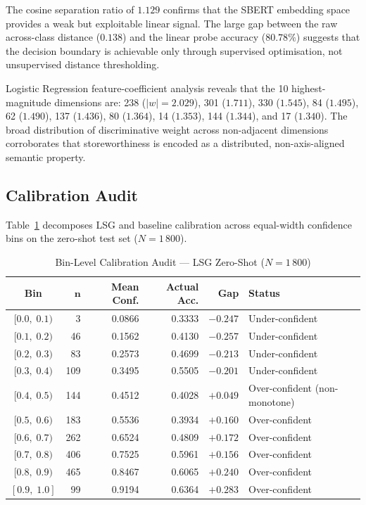 \documentclass[conference]{IEEEtran}
\begin{document}
The cosine separation ratio of $1.129$ confirms that the
SBERT embedding space provides a weak but exploitable
linear signal.
The large gap between the raw across-class distance
($0.138$) and the linear probe accuracy ($80.78\%$) suggests
that the decision boundary is achievable only through
supervised optimisation, not unsupervised distance thresholding.

Logistic Regression feature-coefficient analysis reveals that
the 10 highest-magnitude dimensions are: 238 ($|w|{=}2.029$),
301 ($1.711$), 330 ($1.545$), 84 ($1.495$), 62 ($1.490$),
137 ($1.436$), 80 ($1.364$), 14 ($1.353$), 144 ($1.344$),
and 17 ($1.340$).
The broad distribution of discriminative weight across
non-adjacent dimensions corroborates that storeworthiness is
encoded as a distributed, non-axis-aligned semantic property.

\subsection{Calibration Audit}
Table~\ref{tab:calib} decomposes LSG and baseline calibration
across equal-width confidence bins on the zero-shot test set
($N{=}1\,800$).

\begin{table}[t]
  \centering
  \caption{Bin-Level Calibration Audit --- LSG Zero-Shot ($N{=}1\,800$)}
  \label{tab:calib}
  \renewcommand{\arraystretch}{1.2}
  \begin{tabular}{@{}crrrrp{3.8cm}@{}}
    \toprule
    \textbf{Bin} & $\bm{n}$ & \textbf{Mean Conf.} & \textbf{Actual Acc.} & \textbf{Gap} & \textbf{Status} \\
    \midrule
    $[0.0,\;0.1)$ &   3 & 0.0866 & 0.3333 & $-0.247$ & Under-confident \\
    $[0.1,\;0.2)$ &  46 & 0.1562 & 0.4130 & $-0.257$ & Under-confident \\
    $[0.2,\;0.3)$ &  83 & 0.2573 & 0.4699 & $-0.213$ & Under-confident \\
    $[0.3,\;0.4)$ & 109 & 0.3495 & 0.5505 & $-0.201$ & Under-confident \\
    $[0.4,\;0.5)$ & 144 & 0.4512 & 0.4028 & $+0.049$ & Over-confident (non-monotone) \\
    $[0.5,\;0.6)$ & 183 & 0.5536 & 0.3934 & $+0.160$ & Over-confident \\
    $[0.6,\;0.7)$ & 262 & 0.6524 & 0.4809 & $+0.172$ & Over-confident \\
    $[0.7,\;0.8)$ & 406 & 0.7525 & 0.5961 & $+0.156$ & Over-confident \\
    $[0.8,\;0.9)$ & 465 & 0.8467 & 0.6065 & $+0.240$ & Over-confident \\
    $[0.9,\;1.0]$ &  99 & 0.9194 & 0.6364 & $+0.283$ & Over-confident \\
    \bottomrule
  \end{tabular}
\end{table}
\end{document}
